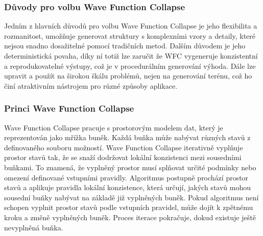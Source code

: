 \subsubsection{Důvody pro volbu Wave Function Collapse}
Jedním z hlavních důvodů pro volbu Wave Function Collapse je jeho flexibilita a rozmanitost, umožňuje generovat struktury s komplexními vzory a detaily, které nejsou snadno dosažitelné pomocí tradičních metod. Dalším důvodem je jeho deterministická povaha, díky ní totiž lze zaručit že WFC vygeneruje konzistentní a reprodukovatelné výstupy, což je v procedurálním generování výhoda. Dále lze upravit a použít na širokou škálu problémů, nejen na generování terénu, což ho činí atraktivním nástrojem pro různé způsoby aplikace.

\subsubsection{Princi Wave Function Collapse}
Wave Function Collapse pracuje s prostorovým modelem dat, který je reprezentován jako mřížka buněk. Každá buňka může nabývat různých stavů z definovaného souboru možností. Wave Function Collapse iterativně vyplňuje prostor stavů tak, že se snaží dodržovat lokální konzistenci mezi sousedními buňkami. To znamená, že vyplněný prostor musí splňovat určité podmínky nebo omezení definované vstupními pravidly. Algoritmus postupně prochází prostor stavů a aplikuje pravidla lokální konzistence, která určují, jakých stavů mohou sousední buňky nabývat na základě již vyplněných buněk. Pokud algoritmus není schopen vyplnit prostor stavů podle vstupních pravidel, může dojít k zpětnému kroku a změně vyplněných buněk. Proces iterace pokračuje, dokud existuje ještě nevyplněná buňka.

